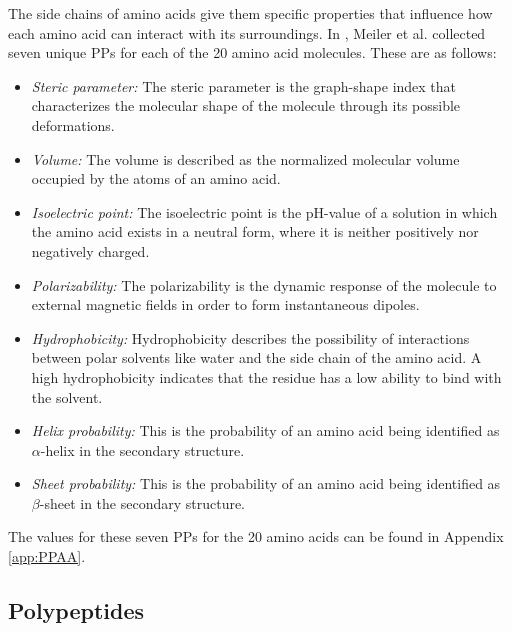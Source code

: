 The side chains of amino acids give them specific properties that influence how each amino acid can interact with its surroundings. 
In \cite{Meiler.2001}, Meiler et al. collected seven unique \acp{PP} for each of the 20 amino acid molecules. These are as follows:



\begin{itemize}
\item \textit{Steric parameter:} The steric parameter is the graph-shape index that characterizes the molecular shape of the molecule through its possible deformations.


\item \textit{Volume:}  The volume is described as the normalized molecular volume occupied by the atoms of an amino acid.

\item \textit{Isoelectric point:} The isoelectric point is the pH-value of a solution in which the amino acid exists in a neutral form, where it is neither positively nor negatively charged. 

\item \textit{Polarizability:} The polarizability is the dynamic response of the molecule to external magnetic fields in order to form instantaneous dipoles. 

\item \textit{Hydrophobicity:}  Hydrophobicity describes the possibility of interactions between polar solvents like water and the side chain of the amino acid. A high hydrophobicity indicates that the residue has a low ability to bind with the solvent.

\item \textit{Helix probability:} This is the probability of an amino acid being identified as $\alpha$-helix in the secondary structure. 

\item \textit{Sheet probability:} This is the probability of an amino acid being identified as $\beta$-sheet in the secondary structure. 

\end{itemize}

The values for these seven \acp{PP} for the 20 amino acids can be found in Appendix \ref{app:PPAA}.



\subsection{Polypeptides}

